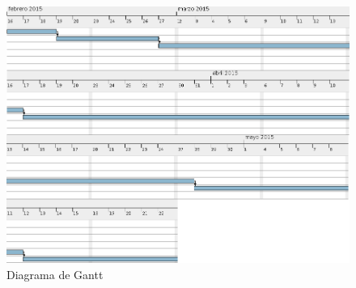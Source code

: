 
\begin{figure}[!ht]
  \begin{center}
    \includegraphics[width=1\textwidth]{imagenes/diagrama_gantt.png}
    \caption{Diagrama de Gantt}
    \label{fig:diag_edt}
  \end{center}
\end{figure}
